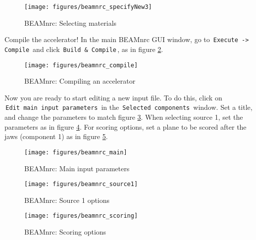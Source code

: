 \documentclass[12pt,twoside]{article}
\begin{document}
\begin{figure}
\begin{center}
\texttt{[image: figures/beamnrc\_specifyNew3]}
\caption{BEAMnrc: Selecting materials}
\label{fig:beamnrc_specifyNew3}
\end{center}
\end{figure}

Compile the accelerator! In the main BEAMnrc GUI window, go to \,\Verb|Execute -> Compile|\, and click \,\Verb|Build & Compile|\,, as in figure \ref{fig:beamnrc_compile}.

\begin{figure}
\begin{center}
\texttt{[image: figures/beamnrc\_compile]}
\caption{BEAMnrc: Compiling an accelerator}
\label{fig:beamnrc_compile}
\end{center}
\end{figure}

Now you are ready to start editing a new input file. To do this, click on \\
\,\Verb|Edit main input parameters|\, in the \,\Verb|Selected components|\, window. Set a title, and change the parameters to match figure \ref{fig:beamnrc_mainInputs}. When selecting source 1, set the parameters as in figure \ref{fig:beamnrc_source1}. For scoring options, set a plane to be scored after the jaws (component 1) as in figure \ref{fig:beamnrc_scoring}.

\begin{figure}
\begin{center}
\texttt{[image: figures/beamnrc\_main]}
\caption{BEAMnrc: Main input parameters}
\label{fig:beamnrc_mainInputs}
\end{center}
\end{figure}

\begin{figure}
\begin{center}
\texttt{[image: figures/beamnrc\_source1]}
\caption{BEAMnrc: Source 1 options}
\label{fig:beamnrc_source1}
\end{center}
\end{figure}

\begin{figure}
\begin{center}
\texttt{[image: figures/beamnrc\_scoring]}
\caption{BEAMnrc: Scoring options}
\label{fig:beamnrc_scoring}
\end{center}
\end{figure}
\end{document}
